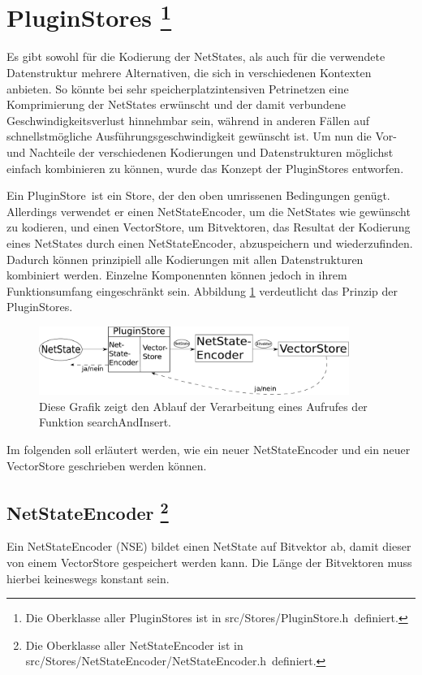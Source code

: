 \documentclass[12pt,a4paper,titlepage]{scrartcl}
\renewcommand \( {\left (}
\renewcommand \) {\right )}
\renewcommand \[ {\left [}
\renewcommand \] {\right ]}
\newcommand \Flqq {\flqq\ }
\begin{document}
\section{PluginStores
\protect\footnote{Die Oberklasse aller PluginStores ist in \frqq src/Stores/PluginStore.h\Flqq definiert.}}
\label{kap:PluginStores}
Es gibt sowohl für die Kodierung der NetStates, als auch für die verwendete Datenstruktur mehrere Alternativen, die sich in verschiedenen Kontexten anbieten. So könnte bei sehr speicherplatzintensiven Petrinetzen eine Komprimierung der NetStates erwünscht und der damit verbundene Geschwindigkeitsverlust hinnehmbar sein, während in anderen Fällen auf schnellstmögliche Ausführungsgeschwindigkeit gewünscht ist. Um nun die Vor- und Nachteile der verschiedenen Kodierungen und Datenstrukturen möglichst einfach kombinieren zu können, wurde das Konzept der PluginStores entworfen.

Ein \frqq PluginStore\Flqq ist ein Store, der den oben umrissenen Bedingungen genügt. Allerdings verwendet er einen NetStateEncoder, um die NetStates wie gewünscht zu kodieren, und einen VectorStore, um Bitvektoren, das Resultat der Kodierung eines NetStates durch einen NetStateEncoder, abzuspeichern und wiederzufinden. Dadurch können prinzipiell alle Kodierungen mit allen Datenstrukturen kombiniert werden. Einzelne Komponennten können jedoch in ihrem Funktionsumfang eingeschränkt sein. Abbildung \ref{fig:plugin} verdeutlicht das Prinzip der PluginStores.
\begin{figure}[ht]
	\begin{center}
		\includegraphics[width = 0.9\textwidth]{Schema.pdf}
		\caption{Diese Grafik zeigt den Ablauf der Verarbeitung eines Aufrufes der Funktion \frqq searchAndInsert\flqq .}
		\label{fig:plugin}
	\end{center}
\end{figure}

Im folgenden soll erläutert werden, wie ein neuer NetStateEncoder und ein neuer VectorStore geschrieben werden können.


\subsection{NetStateEncoder
\protect\footnote{Die Oberklasse aller NetStateEncoder ist in \frqq src/Stores/NetStateEncoder/NetStateEncoder.h\Flqq definiert.}}
\label{kap:NetStateEncoder}
Ein NetStateEncoder (NSE) bildet einen NetState auf Bitvektor ab, damit dieser von einem VectorStore gespeichert werden kann. Die Länge der Bitvektoren muss hierbei keineswegs konstant sein.
\end{document}
